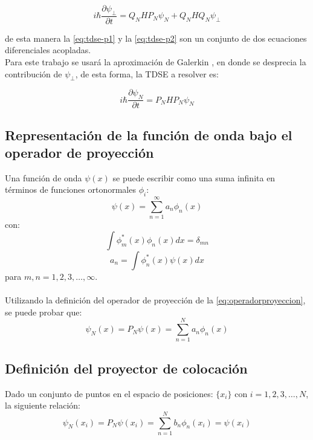 \begin{equation}
  \label{eq:tdse-p2}
  i\hbar\frac{\partial \psi_{\perp}}{\partial t} = Q_NHP_N\psi_N + Q_NHQ_N\psi_{\perp}
\end{equation}

de esta manera la \autoref{eq:tdse-p1} y la \autoref{eq:tdse-p2} son un conjunto de dos ecuaciones diferenciales acopladas.
\\
Para este trabajo se usará la aproximación de Galerkin \cite{Gottlieb}, en donde se desprecia la contribución de $\psi_{\perp}$, de esta forma, la \acs{TDSE} a resolver es:
\begin{tcolorbox}[colback=CTtitle!5!white,colframe=CTtitle!85!white]%
\begin{equation}
\label{eq:TDSEN}
i\hbar \frac{\partial \psi_N}{\partial t} = P_NHP_N\psi_N
\end{equation}
\end{tcolorbox}

\subsection{Representación de la función de onda bajo el operador de proyección}

Una función de onda $\psi(x)$ se puede escribir como una suma infinita en términos de funciones ortonormales $\phi_i$:
\begin{equation}
  \label{eq:wavefuninf}
  \psi(x) = \sum_{n=1}^{\infty}a_n\phi_n(x)
\end{equation}
con:
\[ \int \phi_m^*(x)\phi_n(x)dx = \delta_{mn} \]
\[ a_n = \int \phi_n^*(x)\psi(x)dx\]
para $m,n=1,2,3,\dots, \infty$.
\\
\\
Utilizando la definición del operador de proyección de la \autoref{eq:operadorproyeccion}, se puede probar que:
\begin{equation}
  \label{eq:wavepacketinit}
  \psi_N(x) = P_N\psi(x)=\sum_{n=1}^{N}a_n\phi_n(x)
\end{equation}

\subsection{Definición del proyector de colocación}
Dado un conjunto de puntos en el espacio de posiciones: $\{x_i\}$ con $i=1,2,3,\dots, N$, la siguiente relación:
\begin{equation}
  \label{eq:wavefunexp}
  \psi_N(x_i) = P_N\psi(x_i)=\sum_{n=1}^{N}b_n\phi_n(x_i) = \psi(x_i)
\end{equation}


